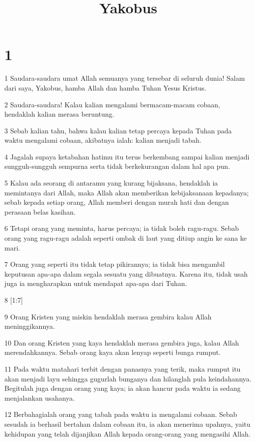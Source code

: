 

\title{Yakobus}


\chapter{1}

\par 1 Saudara-saudara umat Allah semuanya yang tersebar di seluruh dunia! Salam dari saya, Yakobus, hamba Allah dan hamba Tuhan Yesus Kristus.
\par 2 Saudara-saudara! Kalau kalian mengalami bermacam-macam cobaan, hendaklah kalian merasa beruntung.
\par 3 Sebab kalian tahu, bahwa kalau kalian tetap percaya kepada Tuhan pada waktu mengalami cobaan, akibatnya ialah: kalian menjadi tabah.
\par 4 Jagalah supaya ketabahan hatimu itu terus berkembang sampai kalian menjadi sungguh-sungguh sempurna serta tidak berkekurangan dalam hal apa pun.
\par 5 Kalau ada seorang di antaramu yang kurang bijaksana, hendaklah ia memintanya dari Allah, maka Allah akan memberikan kebijaksanaan kepadanya; sebab kepada setiap orang, Allah memberi dengan murah hati dan dengan perasaan belas kasihan.
\par 6 Tetapi orang yang meminta, harus percaya; ia tidak boleh ragu-ragu. Sebab orang yang ragu-ragu adalah seperti ombak di laut yang ditiup angin ke sana ke mari.
\par 7 Orang yang seperti itu tidak tetap pikirannya; ia tidak bisa mengambil keputusan apa-apa dalam segala sesuatu yang dibuatnya. Karena itu, tidak usah juga ia mengharapkan untuk mendapat apa-apa dari Tuhan.
\par 8 [1:7]
\par 9 Orang Kristen yang miskin hendaklah merasa gembira kalau Allah meninggikannya.
\par 10 Dan orang Kristen yang kaya hendaklah merasa gembira juga, kalau Allah merendahkannya. Sebab orang kaya akan lenyap seperti bunga rumput.
\par 11 Pada waktu matahari terbit dengan panasnya yang terik, maka rumput itu akan menjadi layu sehingga gugurlah bunganya dan hilanglah pula keindahannya. Begitulah juga dengan orang yang kaya; ia akan hancur pada waktu ia sedang menjalankan usahanya.
\par 12 Berbahagialah orang yang tabah pada waktu ia mengalami cobaan. Sebab sesudah ia berhasil bertahan dalam cobaan itu, ia akan menerima upahnya, yaitu kehidupan yang telah dijanjikan Allah kepada orang-orang yang mengasihi Allah.
